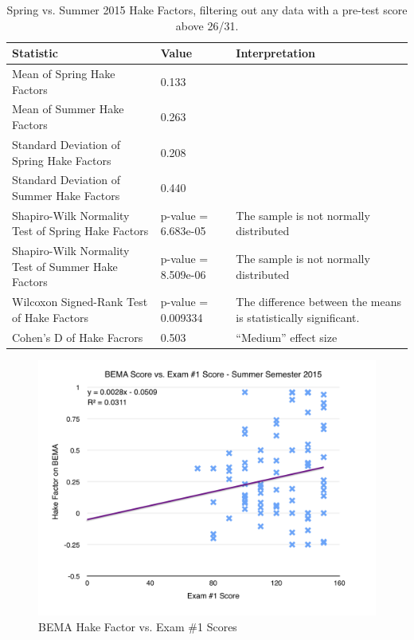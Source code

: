 \begin{landscape}
\begin{table}[!ht]
  \centering
  \begin{tabular}{|l|l|l|}
    \hline
    \textbf{Statistic} & \textbf{Value} & \textbf{Interpretation}\\
	\hline
	Mean of Spring Hake Factors & 0.133 & \\
	\hline
	Mean of Summer Hake Factors & 0.263 & \\
	\hline
	Standard Deviation of Spring Hake Factors & 0.208 & \\
	\hline
	Standard Deviation of Summer Hake Factors & 0.440 & \\
	\hline
	Shapiro-Wilk Normality Test of Spring Hake Factors & p-value = 6.683e-05 & The sample is not normally distributed \\
	\hline
	Shapiro-Wilk Normality Test of Summer Hake Factors & p-value = 8.509e-06 & The sample is not normally distributed \\
	\hline
	Wilcoxon Signed-Rank Test of Hake Factors & p-value = 0.009334 & The difference between the means is statistically significant. \\
	\hline
	Cohen's D of Hake Facrors & 0.503 & ``Medium'' effect size \\
	\hline
  \end{tabular}
  \caption{Spring vs. Summer 2015 Hake Factors, filtering out any data with a pre-test score above 26/31.}
  \label{tab:compareSpSu15}
\end{table}
\end{landscape}

\begin{figure}[!htb]
	\centering
	\includegraphics[width=6in]{img/chapter4/bema_vs_ex1_su15}
	\caption[BEMA Hake Factor vs. Exam \#1 Scores]{BEMA Hake Factor vs. Exam \#1 Scores}
  \label{fig:bemaVsExOneSu15}
\end{figure}

